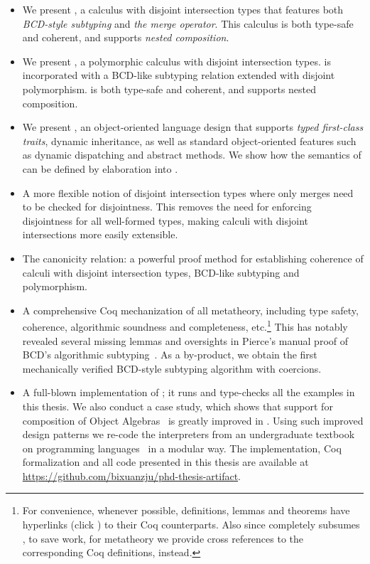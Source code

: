 \begin{itemize}

\item We present \namee, a calculus with disjoint intersection types that
  features both \emph{BCD-style subtyping} and \emph{the merge operator}. This
  calculus is both type-safe and coherent, and supports \emph{nested composition}.

\item We present \fnamee, a polymorphic calculus with disjoint intersection
  types. \fnamee is incorporated with a BCD-like subtyping relation extended
  with disjoint polymorphism. \fnamee is both type-safe and coherent, and
  supports nested composition.

\item We present \sedel, an object-oriented language design that supports
  \emph{typed first-class traits}, dynamic inheritance, as well as standard
  object-oriented features such as dynamic dispatching and abstract methods. We
  show how the semantics of \sedel can be defined by elaboration into \fnamee.

\item A more flexible notion of disjoint intersection types where only merges
  need to be checked for disjointness. This removes the need for enforcing
  disjointness for all well-formed types, making calculi with disjoint
  intersections more easily extensible.

\item The canonicity relation: a powerful proof method for establishing
  coherence of calculi with disjoint intersection types, BCD-like subtyping and
  polymorphism.

\item A comprehensive Coq mechanization of all metatheory, including type
  safety, coherence, algorithmic soundness and completeness, etc.\footnote{For
    convenience, whenever possible, definitions, lemmas and theorems have hyperlinks (click
    \href{https://github.com/bixuanzju/phd-thesis-artifact}{\leftpointright}) to their Coq counterparts. Also since \fnamee completely
    subsumes \namee, to save work, for \namee metatheory we provide cross
    references to the corresponding \fnamee Coq definitions, instead.} This has
  notably revealed several missing lemmas and oversights in Pierce's manual
  proof of BCD's algorithmic subtyping~\citep{pierce1989decision}. As a
  by-product, we obtain the first mechanically verified BCD-style subtyping
  algorithm with coercions.

\item A full-blown implementation of \sedel; it runs and type-checks all the
  examples in this thesis. We also conduct a case study, which shows that
  support for composition of Object Algebras~\citep{oliveira2012extensibility}
  is greatly improved in \sedel. Using such improved design patterns we re-code
  the interpreters from an undergraduate textbook on programming
  languages~\citep{poplcook} in a modular way. The implementation, Coq
  formalization and all code presented in this thesis are available at
  \url{https://github.com/bixuanzju/phd-thesis-artifact}.

\end{itemize}


